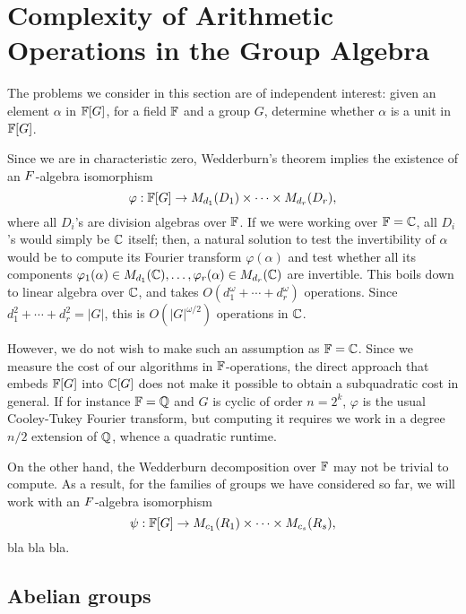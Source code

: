 \section{Complexity of Arithmetic Operations in the Group Algebra}

The problems we consider in this section are of independent interest:
given an element $\alpha$ in $\mathbb{F}[G]$, for a field $\mathbb{F}$ and a group $G$,
determine whether $\alpha$ is a unit in $\mathbb{F}[G]$. 

Since we are in characteristic zero, Wedderburn's theorem implies the
existence of an $\\F$-algebra isomorphism
$$\varphi: \mathbb{F}[G] \to M_{d_1}(D_1) \times \dots \times M_{d_r}(D_r),$$
where all $D_i$'s are division algebras over $\mathbb{F}$. If we were working
over $\mathbb{F}=\mathbb{C}$, all $D_i$'s would simply be $\mathbb{C}$ itself; then, a natural
solution to test the invertibility of $\alpha$ would be to compute its
Fourier transform $\varphi(\alpha)$ and test whether all its
components $\varphi_1(\alpha) \in M_{d_1}(\mathbb{C}),\dots,\varphi_r(\alpha)
\in M_{d_r}(\mathbb{C})$ are invertible. This boils down to linear algebra
over $\mathbb{C}$, and takes $O(d_1^\omega + \cdots + d_r^\omega)$ operations.
Since $d_1^2 + \cdots + d_r^2 = |G|$, this is $O(|G|^{\omega/2})$
operations in $\mathbb{C}$.

However, we do not wish to make such an assumption as $\mathbb{F}=\mathbb{C}$. Since we
measure the cost of our algorithms in $\mathbb{F}$-operations, the direct
approach that embeds $\mathbb{F}[G]$ into $\mathbb{C}[G]$ does not make it possible to
obtain a subquadratic cost in general. If for instance $\mathbb{F}=\mathbb{Q}$ and $G$
is cyclic of order $n=2^k$, $\varphi$ is the usual Cooley-Tukey
Fourier transform, but computing it requires we work in a degree $n/2$
extension of $\mathbb{Q}$, whence a quadratic runtime.

On the other hand, the Wedderburn decomposition over $\mathbb{F}$ may not be
trivial to compute. As a result, for the families of groups we have
considered so far, we will work with an 
 $\\F$-algebra isomorphism
$$\psi: \mathbb{F}[G] \to M_{c_1}(R_1) \times \dots \times M_{c_s}(R_s),$$
bla bla bla.



\subsection{Abelian groups}

